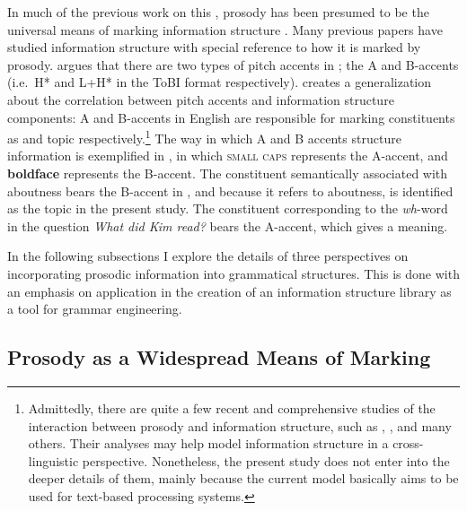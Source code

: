 In much of the previous work on this , prosody has been presumed
to be the universal means of marking information structure
\citep[among many others]{gundel:99,buring:10}. Many
previous papers have studied information structure with special
reference to how it is marked by prosody.  \citet{bolinger:58} argues
that there are two types of pitch accents in ; the A and
B-accents (i.e.\ H* and L+H* in the ToBI format respectively).
\citet{jackendoff:72} creates a generalization about the correlation
between pitch accents and information structure components: A and
B-accents in English are responsible for marking constituents as 
and topic respectively.\footnote{Admittedly, there are quite a few
  recent and comprehensive studies of the interaction between prosody
  and information structure, such as \citet{ladd:08}, 
  \citet{chen:12}, and many others. Their analyses may help model information structure
  in a cross-linguistic perspective. Nonetheless, the present study
  does not enter into the deeper details of them, mainly because the
  current model basically aims to be used for text-based processing
  systems. }  The way in which A and B accents structure information
is exemplified in , in which \textsc{small caps}
represents the A-accent, and \textbf{boldface} represents the
B-accent. The constituent semantically associated with aboutness bears
the B-accent in , and because it refers to aboutness, is
identified as the topic in the present study.  The constituent
corresponding to the \textit{wh}-word in the question \textit{What did
  Kim read?} bears the A-accent, which gives a  meaning.




In the following subsections I explore the details of three
perspectives on incorporating prosodic information into grammatical
structures.  This is done with an emphasis on application in the
creation of an information structure library as a tool for grammar
engineering.


\subsection{Prosody as a Widespread Means of Marking}
\label{4:ssec:universal}

